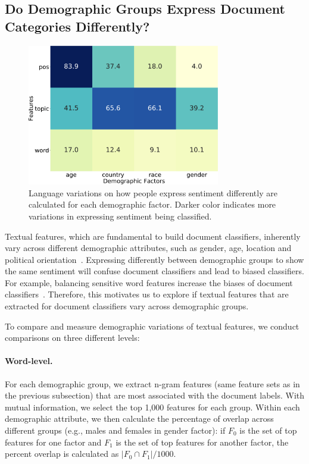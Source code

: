\subsection{Do Demographic Groups Express Document Categories Differently?}

\begin{figure}[tb!]
\centering
\includegraphics[width=0.75\textwidth]{images/chapter5/overlaps.pdf}
\caption{Language variations on how people express sentiment differently are calculated for each demographic factor. Darker color indicates more variations in expressing sentiment being classified.}
\label{chap5:fig:overlaps}
\end{figure}

Textual features, which are fundamental to build document classifiers, inherently vary across different demographic attributes, such as gender, age, location and political orientation~\cite{gao2015more, hinds2018demographic}.
Expressing differently between demographic groups to show the same sentiment will confuse document classifiers and lead to biased classifiers.
For example, balancing sensitive word features increase the biases of document classifiers~\cite{dixon2018measuring}.
Therefore, this motivates us to explore if textual features that are extracted for document classifiers vary across demographic groups.

To compare and measure demographic variations of textual features, we conduct comparisons on three different levels:

\paragraph{Word-level.} For each demographic group, we extract n-gram features (same feature sets as in the previous subsection) that are most associated with the document labels. With mutual information, we select the top 1,000 features for each group. Within each demographic attribute, we then calculate the percentage of overlap across different groups (e.g., males and females in gender factor): if $F_0$ is the set of top features for one factor and $F_1$ is the set of top features for another factor, the percent overlap is calculated as $|F_0 \cap F_1|/1000$.

